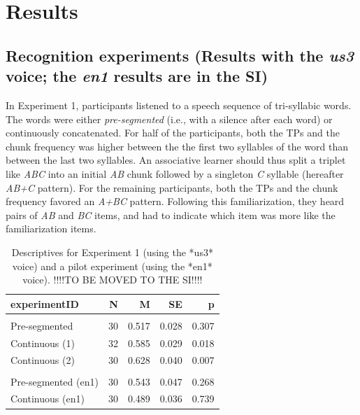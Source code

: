 \documentclass[
]{article}
\begin{document}
\clearpage

\section{Results}\label{results}

\subsection{\texorpdfstring{Recognition experiments (Results with the
\emph{us3} voice; the \emph{en1} results are in the
SI)}{Recognition experiments (Results with the us3 voice; the en1 results are in the SI)}}\label{recognition-experiments-results-with-the-us3-voice-the-en1-results-are-in-the-si}

In Experiment 1, participants listened to a speech sequence of
tri-syllabic words. The words were either \emph{pre-segmented} (i.e.,
with a silence after each word) or continuously concatenated. For half
of the participants, both the TPs and the chunk frequency was higher
between the the first two syllables of the word than between the last
two syllables. An associative learner should thus split a triplet like
\emph{ABC} into an initial \emph{AB} chunk followed by a singleton
\emph{C} syllable (hereafter \emph{AB+C} pattern). For the remaining
participants, both the TPs and the chunk frequency favored an
\emph{A+BC} pattern. Following this familiarization, they heard pairs of
\emph{AB} and \emph{BC} items, and had to indicate which item was more
like the familiarization items.

\begin{longtable}[t]{lrrrr}
\caption{\label{tab:stats-london-descriptives}Descriptives for Experiment 1 (using the *us3* voice) and a pilot experiment (using the *en1* voice). !!!!TO BE MOVED TO THE SI!!!!}\\
\toprule
experimentID & N & M & SE & p\\
\midrule
\addlinespace[0.3em]
\multicolumn{5}{l}{\textbf{us2}}\\
\hspace{1em}Pre-segmented & 30 & 0.517 & 0.028 & 0.307\\
\hspace{1em}Continuous (1) & 32 & 0.585 & 0.029 & 0.018\\
\hspace{1em}Continuous (2) & 30 & 0.628 & 0.040 & 0.007\\
\addlinespace[0.3em]
\multicolumn{5}{l}{\textbf{en1}}\\
\hspace{1em}Pre-segmented (en1) & 30 & 0.543 & 0.047 & 0.268\\
\hspace{1em}Continuous (en1) & 30 & 0.489 & 0.036 & 0.739\\
\bottomrule
\end{longtable}
\end{document}
